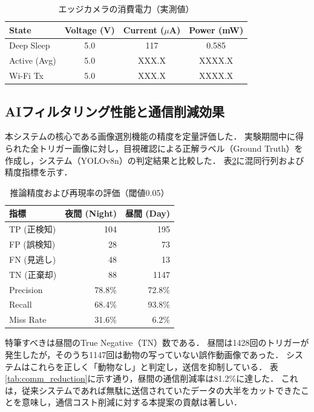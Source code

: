 \documentclass[technicalreport]{ieicej}
\begin{document}
\begin{table}[tb]
  \caption{エッジカメラの消費電力（実測値）}
  \label{tab:camera_power}
  \centering
  \begin{tabular}{l|c|c|c}
    \hline
    State        & Voltage (V) & Current ($\mu$A) & Power (mW) \\
    \hline \hline
    Deep Sleep   & 5.0         & 117              & 0.585      \\
    Active (Avg) & 5.0         & XXX.X            & XXXX.X     \\
    Wi-Fi Tx     & 5.0         & XXX.X            & XXXX.X     \\
    \hline
  \end{tabular}
\end{table}

\subsection{AIフィルタリング性能と通信削減効果}
本システムの核心である画像選別機能の精度を定量評価した．
実験期間中に得られた全トリガー画像に対し，目視確認による正解ラベル（Ground Truth）を作成し，システム（YOLOv8n）の判定結果と比較した．
表\ref{tab:ai_accuracy}に混同行列および精度指標を示す．

\begin{table}[tb]
  \caption{推論精度および再現率の評価（閾値0.05）}
  \label{tab:ai_accuracy}
  \centering
  \begin{tabular}{l|rr}
    \hline
    指標        & 夜間 (Night) & 昼間 (Day) \\
    \hline \hline
    TP (正検知)  & 104        & 195      \\
    FP (誤検知)  & 28         & 73       \\
    FN (見逃し)  & 48         & 13       \\
    TN (正棄却)  & 88         & 1147     \\
    \hline
    Precision & 78.8\%     & 72.8\%   \\
    Recall    & 68.4\%     & 93.8\%   \\
    Miss Rate & 31.6\%     & 6.2\%    \\
    \hline
  \end{tabular}
\end{table}

特筆すべきは昼間のTrue Negative（TN）数である．
昼間は1428回のトリガーが発生したが，そのうち1147回は動物の写っていない誤作動画像であった．
システムはこれらを正しく「動物なし」と判定し，送信を抑制している．
表\ref{tab:comm_reduction}に示す通り，昼間の通信削減率は81.2\%に達した．
これは，従来システムであれば無駄に送信されていたデータの大半をカットできたことを意味し，通信コスト削減に対する本提案の貢献は著しい．
\end{document}
